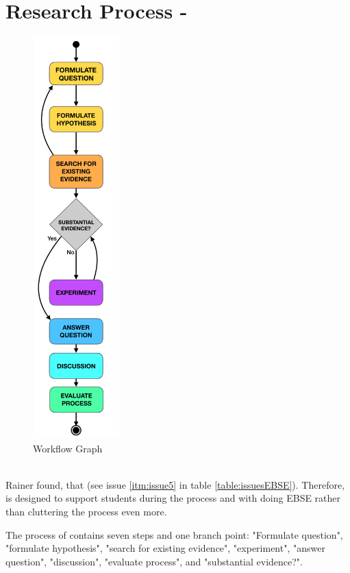 
\section{Research Process - \checklist}
\label{sec:research process}

\begingroup
\begin{figure}
	\centering
	\includegraphics[height=15.5cm]{figures/workflow_graph_croped.pdf}
	\caption{Workflow Graph}
	\label{fig:workflow_graph}
\end{figure}


\\
Rainer \etal found, that \cite{Rainer2006} (see issue \ref{itm:issue5} in table \ref{table:issuesEBSE}). Therefore, \checklist is designed to support students during the process and with doing  EBSE rather than cluttering the process even more.

The process of \checklist {} contains seven steps and one branch point: "Formulate question", "formulate hypothesis", "search for existing evidence", "experiment", "answer question", "discussion", "evaluate process", and "substantial evidence?".


